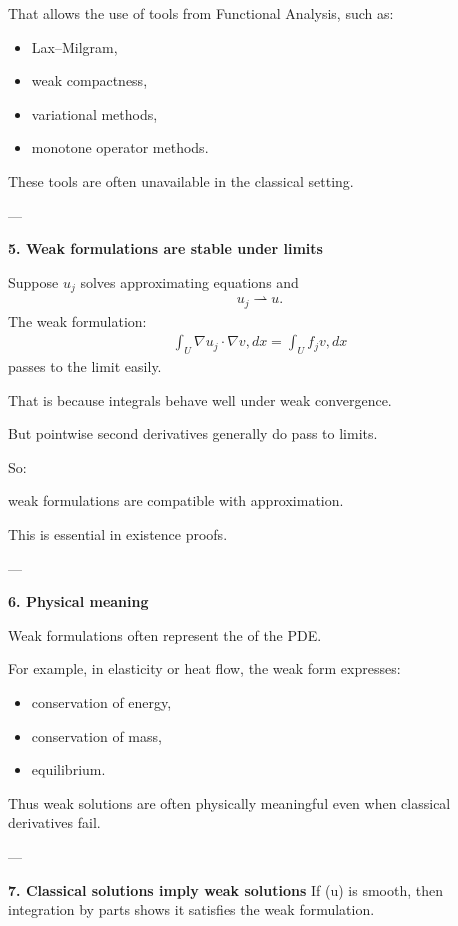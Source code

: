 \documentclass[12pt,a4paper]{report}
\begin{document}
\begin{description}
\begin{description}
That allows the use of tools from Functional Analysis, such as:
\begin{itemize}
\item Lax–Milgram,
\item weak compactness,
\item variational methods,
\item monotone operator methods.
\end{itemize}
These tools are often unavailable in the classical setting.

---

\item \textbf{5. Weak formulations are stable under limits}

Suppose $u_j$ solves approximating equations and
\begin{align*}
u_j\rightharpoonup u.
\end{align*}
The weak formulation:
\begin{align*}
\int_U \nabla u_j\cdot\nabla v,dx=\int_U f_jv,dx
\end{align*}
passes to the limit easily.

That is because integrals behave well under weak convergence.

But pointwise second derivatives generally do  pass to limits.

So:

\> weak formulations are compatible with approximation.

This is essential in existence proofs.

---

\item \textbf{6. Physical meaning}

Weak formulations often represent the  of the PDE.

For example, in elasticity or heat flow, the weak form expresses:
\begin{itemize}
\item conservation of energy,
\item conservation of mass,
\item equilibrium.
\end{itemize}
Thus weak solutions are often physically meaningful even when classical derivatives fail.

---

\item \textbf{7. Classical solutions imply weak solutions}
If (u) is smooth, then integration by parts shows it satisfies the weak formulation.


\end{description}
\end{description}
\end{document}
